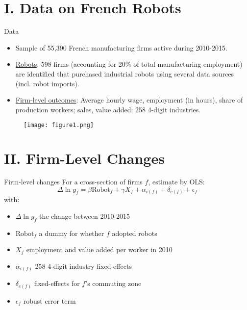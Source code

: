 \documentclass[notes=show]{beamer}
\begin{document}
\section{I. Data on French Robots}

\begin{frame}{Data}
\begin{itemize}
\item Sample of 55,390 French manufacturing firms active during 2010-2015. \medskip
\item \underline{Robots}: 598 firms (accounting for 20\% of total manufacturing employment) are identified that purchased industrial robots using several data sources (incl. robot imports). \medskip
\item \underline{Firm-level outcomes}: Average hourly wage, employment (in hours), share of production workers; sales, value added; 258 4-digit industries.
\end{itemize}
\end{frame}

\newpage
\begin{center}
\vspace*{0.2cm}
\begin{figure}
\texttt{[image: figure1.png]}
\end{figure} 
\end{center}
\newpage

\section{II. Firm-Level Changes}

\begin{frame}{Firm-level changes}
For a cross-section of firms $f$, estimate by OLS:
\[
\Delta \ln y_{f} = \beta \text{Robot}_{f} + \gamma X_{f} + \alpha_{i(f)} + \delta_{c(f)} + \epsilon_{f} \tag{1} \label{eq1}
\]
with:
\begin{itemize}
\item $ \Delta \ln y_{f} $ the change between 2010-2015
\item $ \text{Robot}_{f} $ a dummy for whether $f$ adopted robots
\item $ X_{f} $ employment and value added per worker in 2010
\item $  \alpha_{i(f)} $ 258 4-digit industry fixed-effects
\item $  \delta_{c(f)} $ fixed-effects for $f$'s commuting zone
\item $ \epsilon_{f} $ robust error term
\end{itemize}
\end{frame}
\end{document}
